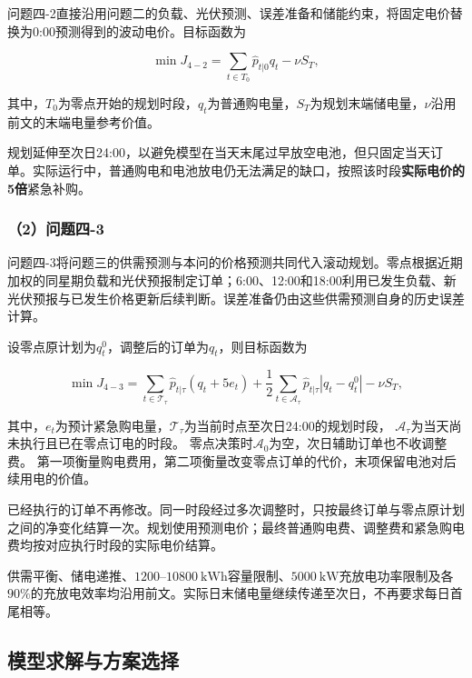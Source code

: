 问题四-2直接沿用问题二的负载、光伏预测、误差准备和储能约束，将固定电价替换为0:00预测得到的波动电价。目标函数为

\begin{equation}
\min J_{4-2}
=
\sum_{t\in T_0}
\hat{p}_{t|0}q_t
-
\nu S_T,
\end{equation}

其中，$T_0$为零点开始的规划时段，$q_t$为普通购电量，$S_T$为规划末端储电量，$\nu$沿用前文的末端电量参考价值。

规划延伸至次日24:00，以避免模型在当天末尾过早放空电池，但只固定当天订单。实际运行中，普通购电和电池放电仍无法满足的缺口，按照该时段\textbf{实际电价的5倍}紧急补购。

\subsubsection*{（2）问题四-3}

问题四-3将问题三的供需预测与本问的价格预测共同代入滚动规划。零点根据近期加权的同星期负载和光伏预报制定订单；6:00、12:00和18:00利用已发生负载、新光伏预报与已发生价格更新后续判断。误差准备仍由这些供需预测自身的历史误差计算。

设零点原计划为$q_t^0$，调整后的订单为$q_t$，则目标函数为

\begin{equation}
\min J_{4-3}
=
\sum_{t\in \mathcal T_{\tau}}
\hat{p}_{t|\tau}
\left(q_t+5e_t\right)
+
\frac{1}{2}
\sum_{t\in \mathcal A_{\tau}}
\hat{p}_{t|\tau}
\left|q_t-q_t^0\right|
-
\nu S_T,
\end{equation}

其中，$e_t$为预计紧急购电量，$\mathcal T_{\tau}$为当前时点至次日24:00的规划时段，
$\mathcal A_{\tau}$为当天尚未执行且已在零点订电的时段。
零点决策时$\mathcal A_0$为空，次日辅助订单也不收调整费。
第一项衡量购电费用，第二项衡量改变零点订单的代价，末项保留电池对后续用电的价值。

已经执行的订单不再修改。同一时段经过多次调整时，只按最终订单与零点原计划之间的净变化结算一次。规划使用预测电价；最终普通购电费、调整费和紧急购电费均按对应执行时段的实际电价结算。

供需平衡、储电递推、$1200$--$10800\ \mathrm{kWh}$容量限制、$5000\ \mathrm{kW}$充放电功率限制及各$90\%$的充放电效率均沿用前文。实际日末储电量继续传递至次日，不再要求每日首尾相等。

\subsection{模型求解与方案选择}

